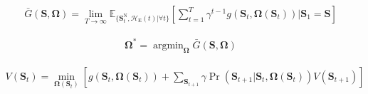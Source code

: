 \documentclass[12pt, draftclsnofoot, onecolumn]{IEEEtran}
\begin{document}
\begin{align}
	\bar{G}(\mathbf{S},\mathbf{\Omega})=\lim_{T\to\infty}\mathbb{E}_{\{\mathbf{S}_{t}^{\mathrm{N}},\mathcal{H}_{\mathrm{E}}(t)|\forall t\}}\left[\sum_{t=1}^{T}\gamma^{t-1}g(\mathbf{S}_{t},\mathbf{\Omega}(\mathbf{S}_{t}))|\mathbf{S}_{1}=\mathbf{S}\right]
\end{align}

\begin{align}
	\mathbf{\Omega}^{*}=\mathop{\arg\min}_{\mathbf{\Omega}}\bar{G}(\mathbf{S},\mathbf{\Omega})
\end{align}

\begin{align}
	V(\mathbf{S}_{t})=\min_{\mathbf{\Omega}(\mathbf{S}_{t})}\left[g(\mathbf{S}_{t},\mathbf{\Omega}(\mathbf{S}_{t}))+\sum_{\mathbf{S}_{t+1}}\gamma\Pr(\mathbf{S}_{t+1}|\mathbf{S}_{t},\mathbf{\Omega}(\mathbf{S}_{t}))V(\mathbf{S}_{t+1})\right]
\end{align}


\appendices


\end{document}
